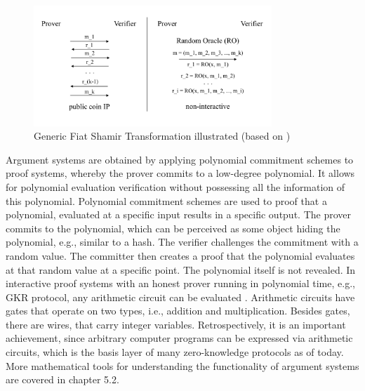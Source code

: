 \begin{figure}[hbt]
	\centering
		\includegraphics[width=0.8\textwidth]{Pictures/FST.png}
	\caption{Generic Fiat Shamir Transformation illustrated (based on \citet{Thaler})}
	\label{fig:FST}
\end{figure}
Argument systems are obtained by applying polynomial commitment schemes to proof systems, whereby the prover commits to a low-degree polynomial. It allows for polynomial evaluation verification without possessing all the information of this polynomial.  Polynomial commitment schemes are used to proof that a polynomial, evaluated at a specific input results in a specific output. The prover commits to the polynomial, which can be perceived as some object hiding the polynomial, e.g., similar to a hash. The verifier challenges the commitment with a random value. The committer then creates a proof that the polynomial evaluates at that random value at a specific point. The polynomial itself is not revealed. In interactive proof systems with an honest prover running in polynomial time, e.g., GKR protocol, any arithmetic circuit can be evaluated \citep{GKR10.1145/1374376.1374396}. Arithmetic circuits have gates that operate on two types, i.e., addition and multiplication. Besides gates, there are wires, that carry integer variables. Retrospectively, it is an important achievement, since arbitrary computer programs can be expressed via arithmetic circuits, which is the basis layer of many zero-knowledge protocols as of today. More mathematical tools for understanding the functionality of argument systems are covered in chapter 5.2.
